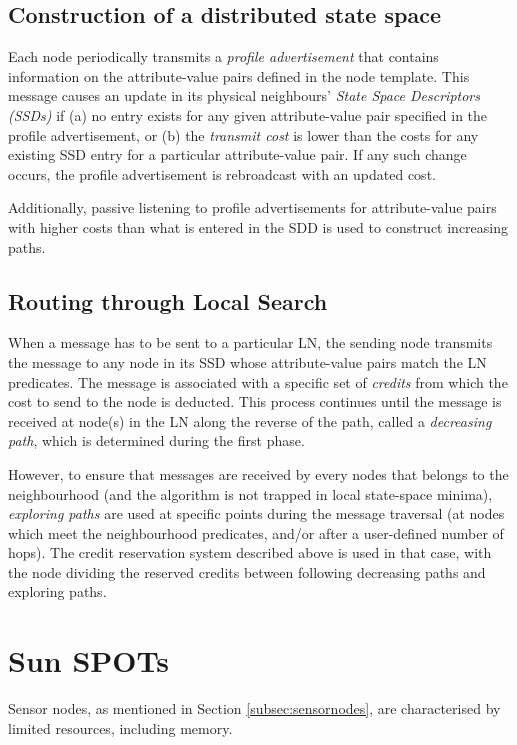 \subsection{Construction of a distributed state space}
Each node periodically transmits a \emph{profile advertisement} that contains
information on the attribute-value pairs defined in the node template. This
message causes an update in its physical neighbours' \emph{State Space
Descriptors (SSDs)} if (a) no entry exists for any given attribute-value pair
specified in the profile advertisement, or (b) the \emph{transmit cost} is lower
than the costs for any existing SSD entry for a particular attribute-value pair.
If any such change occurs, the profile advertisement is rebroadcast with an
updated cost.

Additionally, passive listening to profile advertisements for attribute-value
pairs with higher costs than what is entered in the SDD is used to construct
increasing paths.

\subsection{ Routing through Local Search}
When a message has to be sent to a particular LN, the sending node transmits the
message to any node in its SSD whose attribute-value pairs match the LN
predicates. The message is associated with a specific set of \emph{credits} from
which the cost to send to the node is deducted. This process continues until the
message is received at node(s) in the LN along the reverse of the path, called
a \emph{decreasing path}, which is determined during the first phase. 

However, to ensure that messages are received by every nodes that belongs to the
neighbourhood (and the algorithm is not trapped in local state-space minima),
\emph{exploring paths} are used at specific points during the message traversal
(at nodes which meet the neighbourhood predicates, and/or after a user-defined
number of hops). The credit reservation system described above is used in that
case, with the node dividing the reserved credits between following decreasing
paths and exploring paths.

\section {Sun SPOTs} \label{sec:sunspots}

Sensor nodes, as mentioned in Section \ref{subsec:sensornodes}, are
characterised by limited resources, including memory.
 
